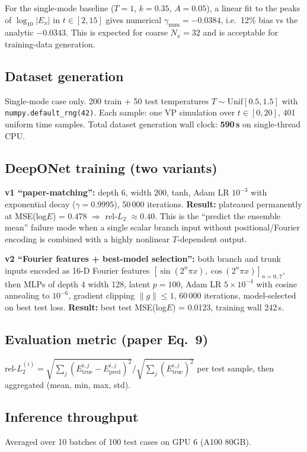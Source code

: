 \documentclass[11pt]{article}
\begin{document}
For the single-mode baseline ($T=1$, $k=0.35$, $A=0.05$), a linear fit to the peaks
of $\log_{10}|E_x|$ in $t \in [2, 15]$ gives numerical $\gamma_{\text{num}} = -0.0384$,
i.e.\ 12\% bias vs the analytic $-0.0343$. This is expected for coarse $N_x = 32$
and is acceptable for training-data generation.

\subsection{Dataset generation}
Single-mode case only. 200 train + 50 test temperatures $T \sim \mathrm{Unif}[0.5, 1.5]$
with \texttt{numpy.default\_rng(42)}. Each sample: one VP simulation over $t \in [0, 20]$,
401 uniform time samples. Total dataset generation wall clock: \textbf{590\,s} on single-thread CPU.

\subsection{DeepONet training (two variants)}
\textbf{v1 ``paper-matching'':} depth 6, width 200, tanh, Adam LR $10^{-3}$ with
exponential decay ($\gamma = 0.9995$), 50\,000 iterations.
\textbf{Result:} plateaued permanently at MSE(log$E$) = 0.478
$\Rightarrow$ rel-$L_2$ $\approx 0.40$.
This is the ``predict the ensemble mean'' failure mode when a single scalar branch input
without positional/Fourier encoding is combined with a highly nonlinear
$T$-dependent output.

\textbf{v2 ``Fourier features + best-model selection'':} both branch and trunk inputs
encoded as 16-D Fourier features
$[\sin(2^n \pi x), \cos(2^n \pi x)]_{n=0..7}$, then MLPs of depth 4 width 128,
latent $p = 100$, Adam LR $5 \times 10^{-4}$ with cosine annealing to $10^{-6}$,
gradient clipping $\|g\| \le 1$, 60\,000 iterations, model-selected on best test loss.
\textbf{Result:} best test MSE(log$E$) = 0.0123, training wall 242\,s.

\subsection{Evaluation metric (paper Eq.~9)}
$\text{rel-}L_2^{(i)} = \sqrt{\sum_j (E_{\text{true}}^{i,j} - E_{\text{pred}}^{i,j})^2} \big/ \sqrt{\sum_j (E_{\text{true}}^{i,j})^2}$
per test sample, then aggregated (mean, min, max, std).

\subsection{Inference throughput}
Averaged over 10 batches of 100 test cases on GPU 6 (A100 80GB).
\end{document}
